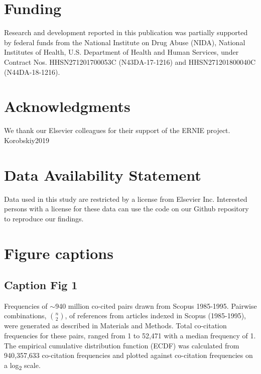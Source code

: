 \documentclass[utf8]{frontiersSCNS}
\begin{document}
\section*{Funding} Research and development reported in this publication was partially supported by federal funds from the National Institute on Drug Abuse (NIDA), National Institutes of Health, U.S. Department of Health and Human Services, under Contract Nos. HHSN271201700053C (N43DA-17-1216) and HHSN271201800040C (N44DA-18-1216).

\section*{Acknowledgments}
We thank our Elsevier colleagues for their support of the ERNIE project. Korobskiy2019


\section*{Data Availability Statement}
Data used in this study are restricted by a license from Elsevier Inc. Interested persons with a license for these data can use the code on our Github repository~\citep{Korobskiy2019} to reproduce our findings. 

 


\section*{Figure captions}

\subsection{Caption Fig 1} Frequencies of $\sim$940 million co-cited pairs drawn from Scopus 1985-1995. Pairwise combinations, $n\choose 2$, of references from articles indexed in Scopus (1985-1995), were generated as described in Materials and Methods. Total co-citation frequencies for these pairs, ranged from 1 to 52,471 with a median frequency of 1. The empirical cumulative distribution function (ECDF) was calculated from 940,357,633 co-citation frequencies and plotted against co-citation frequencies on a log\textsubscript{2} scale.
\end{document}
